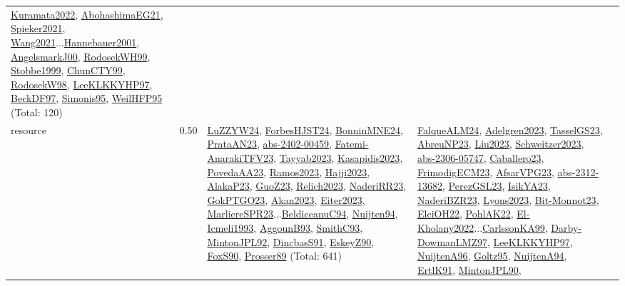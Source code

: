 {\begin{longtable}{p{3cm}r>{\raggedright\arraybackslash}p{6cm}>{\raggedright\arraybackslash}p{6cm}>{\raggedright\arraybackslash}p{8cm}}
\hyperref[detail:Kuramata2022]{Kuramata2022}, \hyperref[detail:AbohashimaEG21]{AbohashimaEG21}, \hyperref[detail:Spieker2021]{Spieker2021}, \hyperref[detail:Wang2021]{Wang2021}...\hyperref[detail:Hannebauer2001]{Hannebauer2001}, \hyperref[detail:AngelsmarkJ00]{AngelsmarkJ00}, \hyperref[detail:RodosekWH99]{RodosekWH99}, \hyperref[detail:Stobbe1999]{Stobbe1999}, \hyperref[detail:ChunCTY99]{ChunCTY99}, \hyperref[detail:RodosekW98]{RodosekW98}, \hyperref[detail:LeeKLKKYHP97]{LeeKLKKYHP97}, \hyperref[detail:BeckDF97]{BeckDF97}, \hyperref[detail:Simonis95]{Simonis95}, \hyperref[detail:WeilHFP95]{WeilHFP95} (Total: 120)\\
\index{resource}\index{Scheduling!resource}resource &  0.50 & \hyperref[detail:LuZZYW24]{LuZZYW24}, \hyperref[detail:ForbesHJST24]{ForbesHJST24}, \hyperref[detail:BonninMNE24]{BonninMNE24}, \hyperref[detail:PrataAN23]{PrataAN23}, \hyperref[detail:abs-2402-00459]{abs-2402-00459}, \hyperref[detail:Fatemi-AnarakiTFV23]{Fatemi-AnarakiTFV23}, \hyperref[detail:Tayyab2023]{Tayyab2023}, \hyperref[detail:Kasapidis2023]{Kasapidis2023}, \hyperref[detail:PovedaAA23]{PovedaAA23}, \hyperref[detail:Ramos2023]{Ramos2023}, \hyperref[detail:Hajji2023]{Hajji2023}, \hyperref[detail:AlakaP23]{AlakaP23}, \hyperref[detail:GuoZ23]{GuoZ23}, \hyperref[detail:Relich2023]{Relich2023}, \hyperref[detail:NaderiRR23]{NaderiRR23}, \hyperref[detail:GokPTGO23]{GokPTGO23}, \hyperref[detail:Akan2023]{Akan2023}, \hyperref[detail:Eiter2023]{Eiter2023}, \hyperref[detail:MarliereSPR23]{MarliereSPR23}...\hyperref[detail:BeldiceanuC94]{BeldiceanuC94}, \hyperref[detail:Nuijten94]{Nuijten94}, \hyperref[detail:Icmeli1993]{Icmeli1993}, \hyperref[detail:AggounB93]{AggounB93}, \hyperref[detail:SmithC93]{SmithC93}, \hyperref[detail:MintonJPL92]{MintonJPL92}, \hyperref[detail:DincbasS91]{DincbasS91}, \hyperref[detail:EskeyZ90]{EskeyZ90}, \hyperref[detail:FoxS90]{FoxS90}, \hyperref[detail:Prosser89]{Prosser89} (Total: 641) & \hyperref[detail:FalqueALM24]{FalqueALM24}, \hyperref[detail:Adelgren2023]{Adelgren2023}, \hyperref[detail:TasselGS23]{TasselGS23}, \hyperref[detail:AbreuNP23]{AbreuNP23}, \hyperref[detail:Liu2023]{Liu2023}, \hyperref[detail:Schweitzer2023]{Schweitzer2023}, \hyperref[detail:abs-2306-05747]{abs-2306-05747}, \hyperref[detail:Caballero23]{Caballero23}, \hyperref[detail:FrimodigECM23]{FrimodigECM23}, \hyperref[detail:AfsarVPG23]{AfsarVPG23}, \hyperref[detail:abs-2312-13682]{abs-2312-13682}, \hyperref[detail:PerezGSL23]{PerezGSL23}, \hyperref[detail:IsikYA23]{IsikYA23}, \hyperref[detail:NaderiBZR23]{NaderiBZR23}, \hyperref[detail:Lyons2023]{Lyons2023}, \hyperref[detail:Bit-Monnot23]{Bit-Monnot23}, \hyperref[detail:ElciOH22]{ElciOH22}, \hyperref[detail:PohlAK22]{PohlAK22}, \hyperref[detail:El-Kholany2022]{El-Kholany2022}...\hyperref[detail:CarlssonKA99]{CarlssonKA99}, \hyperref[detail:Darby-DowmanLMZ97]{Darby-DowmanLMZ97}, \hyperref[detail:LeeKLKKYHP97]{LeeKLKKYHP97}, \hyperref[detail:NuijtenA96]{NuijtenA96}, \hyperref[detail:Goltz95]{Goltz95}, \hyperref[detail:NuijtenA94]{NuijtenA94}, \hyperref[detail:ErtlK91]{ErtlK91}, \hyperref[detail:MintonJPL90]{MintonJPL90}, 
\end{longtable}}
